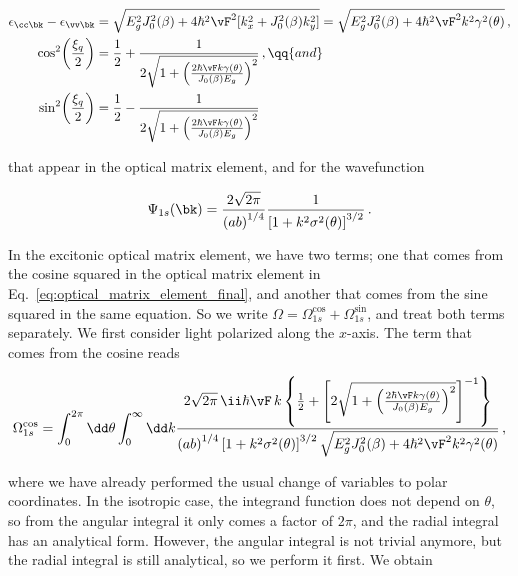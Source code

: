 \begin{equation}
    \begin{aligned}
        \epsilon_{\cc \bk}-\epsilon_{\vv \bk} &= \sqrt{E_{g}^{2}J_{0}^{2}(\beta)+4\hbar^{2} \vF ^{2}[k_{x}^2 + J^2_{0}(\beta)k_{y}^2]} = \sqrt{E_{g}^{2}J_{0}^{2}(\beta) + 4\hbar^{2} \vF ^{2}k^{2} \gamma^{2}(\theta)}\,, \\
        \cos^2\!\left(\frac{\xi_{q}}{2}\right) &= \frac{1}{2} + \frac{1}{2\sqrt{1+\left(\frac{2 \hbar  \vF k \gamma(\theta)}{J_{0}(\beta)E_{g}}\right)^{2}}}\,, \qq{and} \\
        \sin^{2}\!\left(\frac{\xi_{q}}{2}\right) &= \frac{1}{2} - \frac{1}{2\sqrt{1+\left(\frac{2 \hbar  \vF k \gamma(\theta)}{J_{0}(\beta)E_{g}}\right)^{2}}}
    \end{aligned}
\end{equation}

\noindent that appear in the optical matrix element, and for the wavefunction

\begin{equation}
    \Psi_{1s}(\bk) =  \frac{2\sqrt{2\pi}}{\left(a b \right)^{1/4}}\frac{1}{\left[1+k^2 \sigma^2(\theta) \right]^{3/2}}\,.
\end{equation}

\noindent In the excitonic optical matrix element, we have two terms; one that comes from the cosine squared in the optical matrix element in Eq.~\eqref{eq:optical_matrix_element_final}, and another that comes from the sine squared in the same equation.
So we write $\Omega  = \Omega^{\cos}_{1s} + \Omega^{\sin}_{1s}$, and treat both terms separately.
We first consider light polarized along the $x$-axis.
The term that comes from the cosine reads

\begin{equation}
    \Omega^{\cos}_{1s} = \int_{0}^{2\pi} \dd\theta \int_{0}^{\infty} \dd k \frac{ 2\sqrt{2\pi} \,\ii \hbar \vF \,k  \left\{\frac{1}{2} + \left[2 \sqrt{1+\left(\frac{2\hbar \vF k \gamma(\theta)}{J_{0}(\beta)E_{g}}\right)^{2}}\right]^{-1}\right\}}{\left(a b\right)^{1/4} \left[1+k^{2}\sigma^{2}(\theta)\right]^{3/2} \sqrt{E_{g}^{2}J_{0}^{2}(\beta)+4\hbar^{2}\vF^{2}k^{2}\gamma^{2}(\theta)}}\,,
\end{equation}

\noindent where we have already performed the usual change of variables to polar coordinates.
In the isotropic case, the integrand function does not depend on $\theta$, so from the angular integral it only comes a factor of $2 \pi$, and the radial integral has an analytical form.
However, the angular integral is not trivial anymore, but the radial integral is still analytical, so we perform it first.
We obtain

